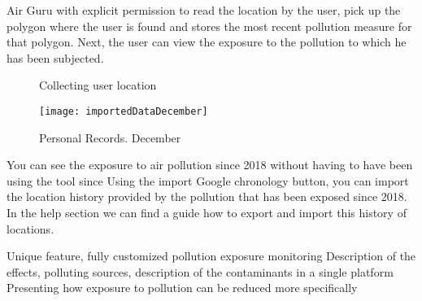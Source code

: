 Air Guru with explicit permission to read the location by the user, pick up the polygon where
the user is found and stores the most recent pollution measure for that polygon. Next, the
user can view the exposure to the pollution to which he has been subjected.
\begin{figure}[ht]
    \centering 
      \caption{Collecting user location}
    \end{figure}
    \newpage
    \begin{figure}[ht]
        \centering
        \texttt{[image: importedDataDecember]}
        \caption{Personal Records. December}
    \end{figure}
    You can see the exposure to air pollution since 2018 without having to have been using the tool since
    Using the import Google chronology button, you can import the location history provided by the
    pollution that has been exposed since 2018. In the help section we can find a guide how to
    export and import this history of locations.
\begin{itemize}
    \done Unique feature, fully customized pollution exposure monitoring
    \done Description of the effects, polluting sources, description of the contaminants in a single platform
    \crossed Presenting how exposure to pollution can be reduced more specifically
    
\end{itemize}
\newpage